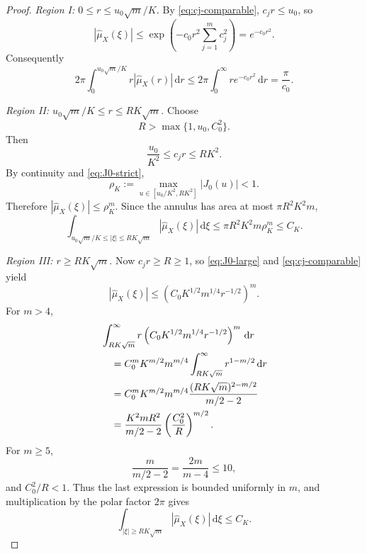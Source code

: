 \documentclass[11pt]{article}
\theoremstyle{definition}
\newcommand{\dd}{\,\mathrm d}
\newcommand{\1}{\mathbf 1}
\begin{document}
\begin{proof}
\smallskip
\noindent\emph{Region I: $0\le r\le u_0\sqrt m/K$.}
By \eqref{eq:cj-comparable}, $c_jr\le u_0$, so
\begin{equation}\label{eq:region-I}
|\widehat\mu_X(\xi)|
\le
\exp\left(-c_0r^2\sum_{j=1}^mc_j^2\right)
=e^{-c_0r^2}.
\end{equation}
Consequently
\begin{equation}\label{eq:region-I-integral}
2\pi\int_0^{u_0\sqrt m/K}r|\widehat\mu_X(r)|\dd r
\le
2\pi\int_0^\infty re^{-c_0r^2}\dd r
=\frac{\pi}{c_0}.
\end{equation}

\smallskip
\noindent\emph{Region II: $u_0\sqrt m/K\le r\le RK\sqrt m$.}
Choose
\begin{equation}\label{eq:R-choice}
R>\max\{1,u_0,C_0^2\}.
\end{equation}
Then
\begin{equation}\label{eq:middle-arguments}
\frac{u_0}{K^2}\le c_jr\le RK^2.
\end{equation}
By continuity and \eqref{eq:J0-strict},
\begin{equation}\label{eq:rhoK}
\rho_K
:=
\max_{u\in[u_0/K^2,RK^2]}|J_0(u)|
<1.
\end{equation}
Therefore $|\widehat\mu_X(\xi)|\le\rho_K^m$.  Since the annulus has area at most $\pi R^2K^2m$,
\begin{equation}\label{eq:region-II-integral}
\int_{u_0\sqrt m/K\le|\xi|\le RK\sqrt m}
|\widehat\mu_X(\xi)|\dd\xi
\le \pi R^2K^2m\rho_K^m
\le C_K.
\end{equation}

\smallskip
\noindent\emph{Region III: $r\ge RK\sqrt m$.}
Now $c_jr\ge R\ge1$, so \eqref{eq:J0-large} and \eqref{eq:cj-comparable} yield
\begin{equation}\label{eq:region-III-pointwise}
|\widehat\mu_X(\xi)|
\le
\left(C_0K^{1/2}m^{1/4}r^{-1/2}\right)^m.
\end{equation}
For $m>4$,
\begin{align}
&\int_{RK\sqrt m}^{\infty}
 r\left(C_0K^{1/2}m^{1/4}r^{-1/2}\right)^m\dd r\notag\\
&\quad=
C_0^mK^{m/2}m^{m/4}
\int_{RK\sqrt m}^{\infty}r^{1-m/2}\dd r\notag\\
&\quad=
C_0^mK^{m/2}m^{m/4}
\frac{(RK\sqrt m)^{2-m/2}}{m/2-2}\notag\\
&\quad=
\frac{K^2mR^2}{m/2-2}
\left(\frac{C_0^2}{R}\right)^{m/2}.
\label{eq:region-III-exact}
\end{align}
For $m\ge5$,
\[
\frac{m}{m/2-2}=\frac{2m}{m-4}\le10,
\]
and $C_0^2/R<1$.  Thus the last expression is bounded uniformly in $m$, and multiplication by the polar factor $2\pi$ gives
\begin{equation}\label{eq:region-III-integral}
\int_{|\xi|\ge RK\sqrt m}|\widehat\mu_X(\xi)|\dd\xi\le C_K.
\end{equation}


\end{proof}
\end{document}
